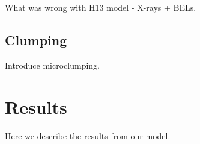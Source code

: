 \documentclass[useAMS,usenatbib]{mn2e_x}
\begin{document}
What was wrong with H13 model - X-rays + BELs.

\subsection{Clumping}

Introduce microclumping.










\section{Results}

Here we describe the results from our model.
\end{document}
